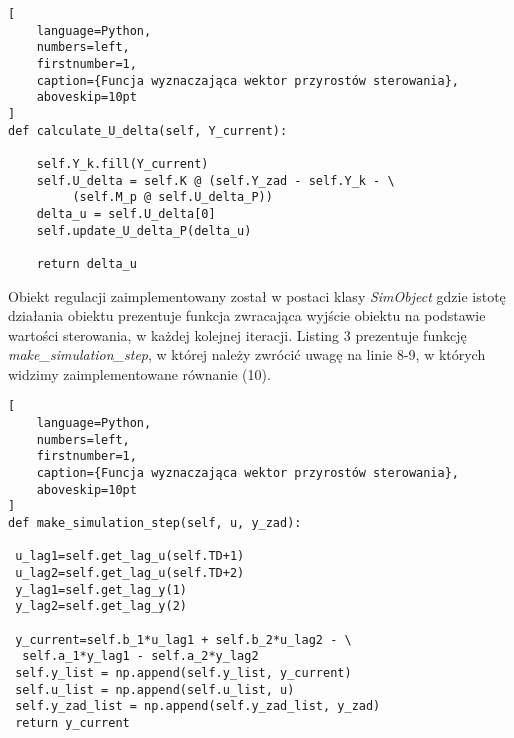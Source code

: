 \begin{addmargin}[6mm]{0mm}
\begin{lstlisting}[
    language=Python,
    numbers=left,
    firstnumber=1,
    caption={Funcja wyznaczająca wektor przyrostów sterowania},
    aboveskip=10pt
]
def calculate_U_delta(self, Y_current): 

	self.Y_k.fill(Y_current)
	self.U_delta = self.K @ (self.Y_zad - self.Y_k - \
		 (self.M_p @ self.U_delta_P))
	delta_u = self.U_delta[0]
	self.update_U_delta_P(delta_u)

	return delta_u
\end{lstlisting}
\end{addmargin}

\par Obiekt regulacji zaimplementowany został w postaci klasy \emph{SimObject} gdzie istotę działania obiektu prezentuje funkcja zwracająca wyjście obiektu na podstawie wartości sterowania, w każdej kolejnej iteracji. Listing 3 prezentuje funkcję \emph{make{\_}simulation{\_}step}, w której należy zwrócić uwagę na linie 8-9, w których widzimy zaimplementowane równanie (10). 
\begin{addmargin}[10mm]{0mm}
\begin{lstlisting}[
    language=Python,
    numbers=left,
    firstnumber=1,
    caption={Funcja wyznaczająca wektor przyrostów sterowania},
    aboveskip=10pt
]
def make_simulation_step(self, u, y_zad):
		
 u_lag1=self.get_lag_u(self.TD+1)
 u_lag2=self.get_lag_u(self.TD+2)
 y_lag1=self.get_lag_y(1)
 y_lag2=self.get_lag_y(2)

 y_current=self.b_1*u_lag1 + self.b_2*u_lag2 - \
  self.a_1*y_lag1 - self.a_2*y_lag2
 self.y_list = np.append(self.y_list, y_current)
 self.u_list = np.append(self.u_list, u)
 self.y_zad_list = np.append(self.y_zad_list, y_zad)
 return y_current
\end{lstlisting}
\end{addmargin}
 
